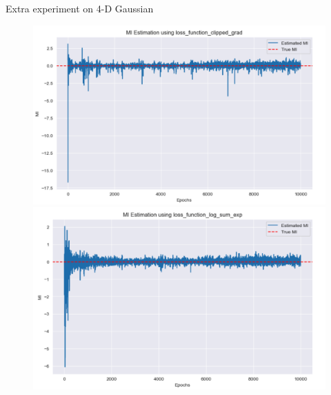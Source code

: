 \documentclass[final]{beamer}
\newlength{\colwidth}
\begin{document}
\begin{frame}[t]
\begin{columns}[t]
\begin{column}{\colwidth}
\begin{block}{Extra experiment on 4-D Gaussian}
    \begin{figure}
    \centering
    \begin{minipage}{0.49\textwidth}
    \centering
    \includegraphics[width=1\linewidth]{4d/截屏2024-12-31 13.58.54.png}
    \end{minipage}
    \begin{minipage}{0.49\textwidth}
    \centering
    \centering
    \includegraphics[width=1\linewidth]{4d/截屏2024-12-31 13.59.08.png}
    \end{minipage}
    \end{figure}


\end{block}
\end{column}
\end{columns}
\end{frame}
\end{document}
